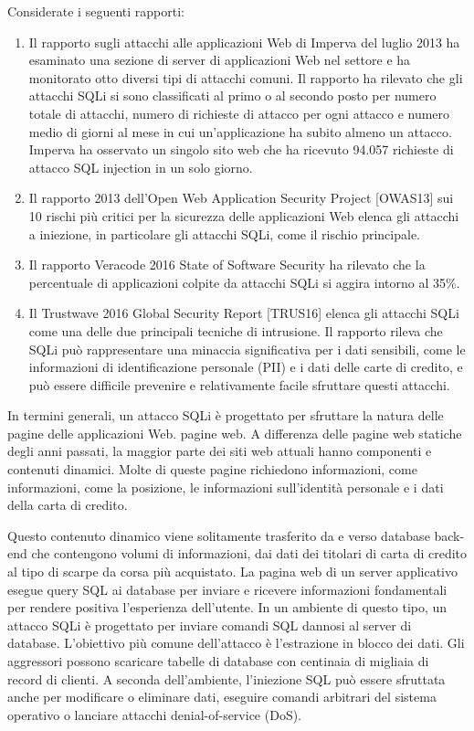 \singlespacing

Considerate i seguenti rapporti:

\begin{enumerate}
    \item Il rapporto sugli attacchi alle applicazioni Web di Imperva del luglio 2013 ha esaminato una sezione di server di applicazioni Web nel settore e ha monitorato otto diversi tipi di attacchi comuni. Il rapporto ha rilevato che gli attacchi SQLi si sono classificati al primo o al secondo posto per numero totale di attacchi, numero di richieste di attacco per ogni attacco e numero medio di giorni al mese in cui un'applicazione ha subito almeno un attacco. Imperva ha osservato un singolo sito web che ha ricevuto 94.057 richieste di attacco SQL injection in un solo giorno.
    
    \item Il rapporto 2013 dell'Open Web Application Security Project [OWAS13] sui 10 rischi più critici per la sicurezza delle applicazioni Web elenca gli attacchi a iniezione, in particolare gli attacchi SQLi, come il rischio principale.
    
    \item  Il rapporto Veracode 2016 State of Software Security ha rilevato che la percentuale di applicazioni colpite da attacchi SQLi si aggira intorno al 35\%.
    
    \item Il Trustwave 2016 Global Security Report [TRUS16] elenca gli attacchi SQLi come una delle due principali tecniche di intrusione. Il rapporto rileva che SQLi può rappresentare una minaccia significativa per i dati sensibili, come le informazioni di identificazione personale (PII) e i dati delle carte di credito, e può essere difficile prevenire e relativamente facile sfruttare questi attacchi.
\end{enumerate}

In termini generali, un attacco SQLi è progettato per sfruttare la natura delle pagine delle applicazioni Web.
pagine web. A differenza delle pagine web statiche degli anni passati, la maggior parte dei siti web attuali hanno componenti e contenuti dinamici. Molte di queste pagine richiedono informazioni, come informazioni, come la posizione, le informazioni sull'identità personale e i dati della carta di credito. 

\singlespacing

Questo contenuto dinamico viene solitamente trasferito da e verso database back-end che contengono volumi di informazioni, dai dati dei titolari di carta di credito al tipo di scarpe da corsa più acquistato. La pagina web di un server applicativo esegue query SQL ai database per inviare e ricevere informazioni fondamentali per rendere positiva l'esperienza dell'utente. In un ambiente di questo tipo, un attacco SQLi è progettato per inviare comandi SQL dannosi al server di database. L'obiettivo più comune dell'attacco è l'estrazione in blocco dei dati. Gli aggressori possono scaricare tabelle di database con centinaia di migliaia di record di clienti. A seconda dell'ambiente, l'iniezione SQL può essere sfruttata anche per modificare o eliminare dati, eseguire comandi arbitrari del sistema operativo o lanciare attacchi denial-of-service (DoS). 

